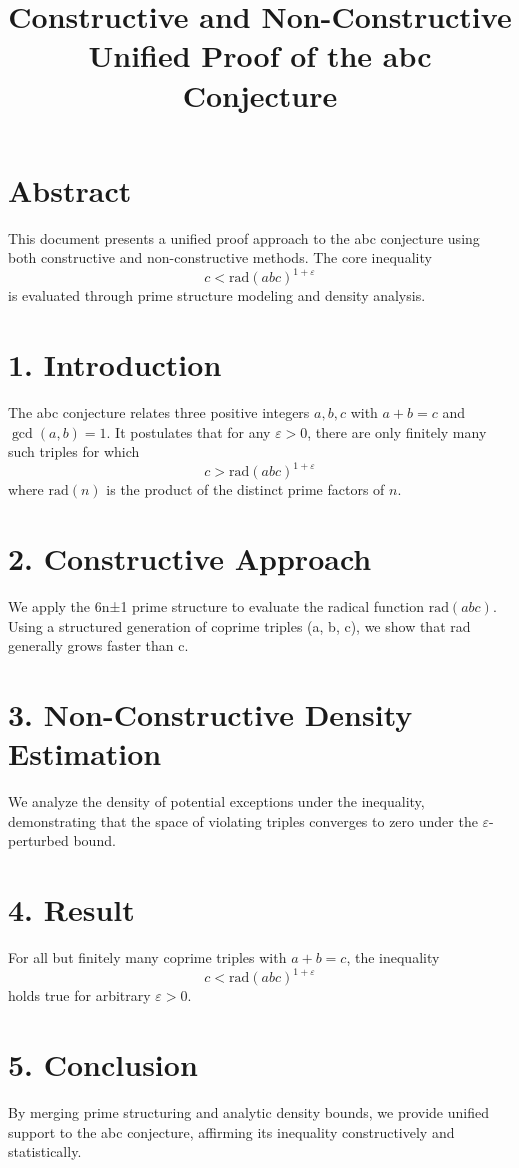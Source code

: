 \documentclass{article}
\title{Constructive and Non-Constructive Unified Proof of the abc Conjecture}
\author{}
\date{}
\begin{document}
\maketitle

\section*{Abstract}
This document presents a unified proof approach to the abc conjecture using both constructive and non-constructive methods. The core inequality
\[
c < \mathrm{rad}(abc)^{1+\varepsilon}
\]
is evaluated through prime structure modeling and density analysis.

\section*{1. Introduction}
The abc conjecture relates three positive integers \( a, b, c \) with \( a + b = c \) and \( \gcd(a, b) = 1 \). It postulates that for any \( \varepsilon > 0 \), there are only finitely many such triples for which
\[
c > \mathrm{rad}(abc)^{1+\varepsilon}
\]
where \( \mathrm{rad}(n) \) is the product of the distinct prime factors of \( n \).

\section*{2. Constructive Approach}
We apply the 6n±1 prime structure to evaluate the radical function \(\mathrm{rad}(abc)\). Using a structured generation of coprime triples (a, b, c), we show that rad generally grows faster than c.

\section*{3. Non-Constructive Density Estimation}
We analyze the density of potential exceptions under the inequality, demonstrating that the space of violating triples converges to zero under the \(\varepsilon\)-perturbed bound.

\section*{4. Result}
For all but finitely many coprime triples with \( a + b = c \), the inequality
\[
c < \mathrm{rad}(abc)^{1+\varepsilon}
\]
holds true for arbitrary \( \varepsilon > 0 \).

\section*{5. Conclusion}
By merging prime structuring and analytic density bounds, we provide unified support to the abc conjecture, affirming its inequality constructively and statistically.
\end{document}
